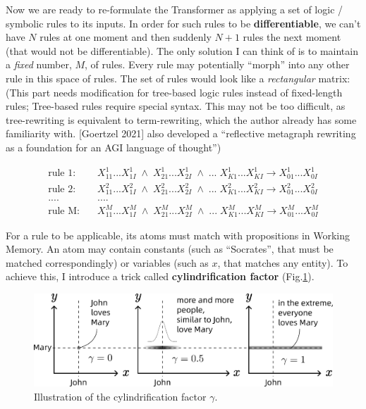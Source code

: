 \documentclass[runningheads]{llncs}
\begin{document}
Now we are ready to re-formulate the Transformer as applying a set of logic / symbolic rules to its inputs.  In order for such rules to be \textbf{differentiable}, we can't have $N$ rules at one moment and then suddenly $N+1$ rules the next moment (that would not be differentiable).  The only solution I can think of is to maintain a \textit{fixed} number, $M$, of rules.  Every rule may potentially ``morph'' into any other rule in this space of rules.  The set of rules would look like a \textit{rectangular} matrix: {\color{red}(This part needs modification for tree-based logic rules instead of fixed-length rules; Tree-based rules require special syntax.  This may not be too difficult, as tree-rewriting is equivalent to term-rewriting, which the author already has some familiarity with.  [Goertzel 2021] also developed a ``reflective metagraph rewriting as a foundation for an AGI language of thought'')}

\begin{equation}
\begin{aligned}
\mbox{rule 1:} & \quad \boxed{X^1_{11}... X^1_{1I}} \;\wedge\; \boxed{X^1_{21} ... X^1_{2I}} \;\wedge\;...\; \boxed{X^1_{K1} ... X^1_{KI}} \rightarrow \boxed{X^1_{01} ... X^1_{0I}} \\
\mbox{rule 2:} & \quad \boxed{X^2_{11}... X^2_{1I}} \;\wedge\; \boxed{X^2_{21} ... X^2_{2I}} \;\wedge\;...\; \boxed{X^2_{K1} ... X^2_{KI}} \rightarrow \boxed{X^2_{01} ... X^2_{0I}} \\
.... & \quad .... \\
\mbox{rule M:} & \quad \boxed{X^M_{11}... X^M_{1I}} \;\wedge\; \boxed{X^M_{21} ... X^M_{2I}} \;\wedge\;...\; \boxed{X^M_{K1} ... X^M_{KI}} \rightarrow \boxed{X^M_{01} ... X^M_{0I}}
\end{aligned}
\end{equation}

For a rule to be applicable, its atoms must match with propositions in Working Memory.  An atom may contain constants (such as ``Socrates'', that must be matched correspondingly) or variables (such as $x$, that matches any entity).  To achieve this, I introduce a trick called \textbf{cylindrification factor} (Fig.\ref{fig:cylindrify-example}).

\begin{figure}
	\includegraphics[scale=.6]{cylindrify-example.png}
	\caption{Illustration of the cylindrification factor $\gamma$.}
	\label{fig:cylindrify-example}
\end{figure}
\end{document}
